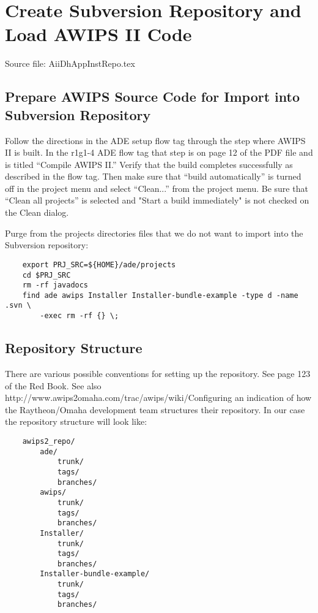 
\section{Create Subversion Repository and Load AWIPS II Code}

Source file: AiiDhAppInstRepo.tex


\subsection{Prepare AWIPS Source Code for Import into Subversion
Repository}

Follow the directions in the ADE setup flow tag through the step
where AWIPS II is built.  In the r1g1-4 ADE flow tag that step
is on page 12 of the PDF file and is titled ``Compile AWIPS II.''
Verify that the build completes successfully as described in the
flow tag.  Then make sure that ``build automatically'' is turned off
in the project menu and select ``Clean...'' from the project menu.
Be sure that ``Clean all projects'' is selected and 
"Start a build immediately" is not checked on the Clean
dialog.

Purge from the projects directories files that we do not want to import
into the Subversion repository:

\begin{verbatim}
    export PRJ_SRC=${HOME}/ade/projects
    cd $PRJ_SRC
    rm -rf javadocs
    find ade awips Installer Installer-bundle-example -type d -name .svn \
        -exec rm -rf {} \;
\end{verbatim}


\subsection{Repository Structure}

There are various possible conventions for setting up
the repository.  See page 123 of the Red Book.  See also
http://www.awips2omaha.com/trac/awips/wiki/Configuring%
an indication of how the Raytheon/Omaha development team structures
their repository.  In our case the repository structure will look like:

\begin{verbatim}
    awips2_repo/
        ade/
            trunk/
            tags/
            branches/
        awips/
            trunk/
            tags/
            branches/
        Installer/
            trunk/
            tags/
            branches/
        Installer-bundle-example/
            trunk/
            tags/
            branches/
\end{verbatim}

